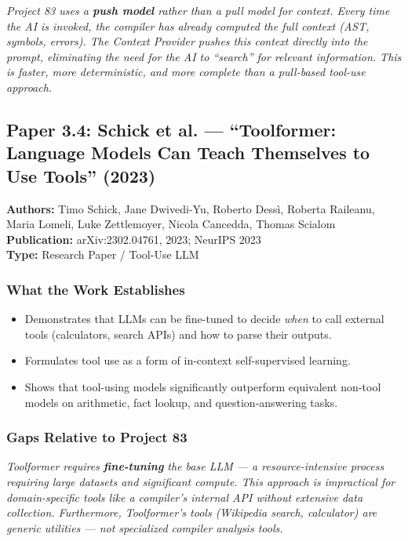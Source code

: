 \documentclass[a4paper,11pt]{article}
\newcommand{\papergap}[1]{%
  \begin{tcolorbox}[colback=red!5!white, colframe=red!60!black, title={Research Gap Identified}]
  \textit{#1}
  \end{tcolorbox}
}
\newcommand{\oursolution}[1]{%
  \begin{tcolorbox}[colback=green!5!white, colframe=green!60!black, title={How Project 83 Solves This Gap}]
  \textit{#1}
  \end{tcolorbox}
}
\begin{document}
\oursolution{Project 83 uses a \textbf{push model} rather than a pull model for context. Every time the AI is invoked, the compiler has \textit{already computed} the full context (AST, symbols, errors). The Context Provider \textit{pushes} this context directly into the prompt, eliminating the need for the AI to ``search'' for relevant information. This is faster, more deterministic, and more complete than a pull-based tool-use approach.}

\subsection{Paper 3.4: Schick et al. --- ``Toolformer: Language Models Can Teach Themselves to Use Tools'' (2023)}

\begin{tcolorbox}[colback=gray!5, colframe=gray!40]
\textbf{Authors:} Timo Schick, Jane Dwivedi-Yu, Roberto Dessì, Roberta Raileanu, Maria Lomeli, Luke Zettlemoyer, Nicola Cancedda, Thomas Scialom \\
\textbf{Publication:} arXiv:2302.04761, 2023; NeurIPS 2023 \\
\textbf{Type:} Research Paper / Tool-Use LLM
\end{tcolorbox}

\subsubsection{What the Work Establishes}

\begin{itemize}
    \item Demonstrates that LLMs can be fine-tuned to decide \textit{when} to call external tools (calculators, search APIs) and how to parse their outputs.
    \item Formulates tool use as a form of in-context self-supervised learning.
    \item Shows that tool-using models significantly outperform equivalent non-tool models on arithmetic, fact lookup, and question-answering tasks.
\end{itemize}

\subsubsection{Gaps Relative to Project 83}

\papergap{Toolformer requires \textbf{fine-tuning} the base LLM --- a resource-intensive process requiring large datasets and significant compute. This approach is impractical for domain-specific tools like a compiler's internal API without extensive data collection. Furthermore, Toolformer's tools (Wikipedia search, calculator) are generic utilities --- not specialized compiler analysis tools.}
\end{document}
